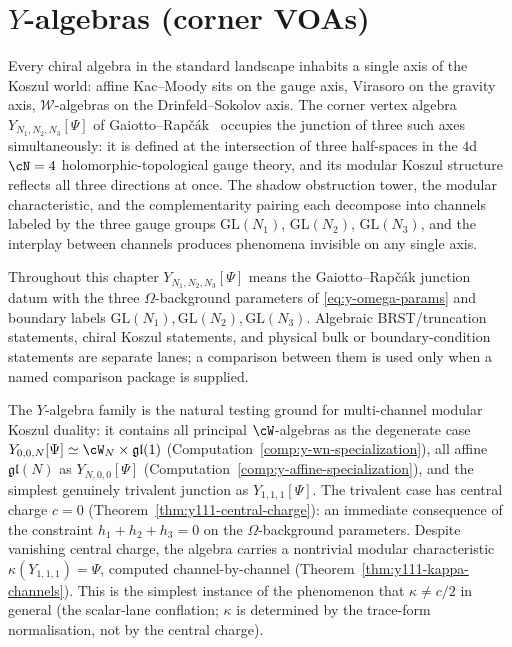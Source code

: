 \chapter{\texorpdfstring{$Y$-algebras (corner VOAs)}{Y-algebras (corner VOAs)}}\label{chap:y-algebras}\label{ch:y-algebras}

Every chiral algebra in the standard landscape inhabits a single
axis of the Koszul world: affine Kac--Moody sits on the gauge axis,
Virasoro on the gravity axis, $\mathcal{W}$-algebras on the
Drinfeld--Sokolov axis. The corner vertex algebra
$Y_{N_1,N_2,N_3}[\Psi]$ of
Gaiotto--Rap\v{c}\'ak~\cite{gaiotto-rapchak} occupies the junction
of three such axes simultaneously: it is defined at the
intersection of three half-spaces in the $4$d $\cN = 4$
holomorphic-topological gauge theory, and its modular Koszul
structure reflects all three directions at once. The shadow
obstruction tower, the modular characteristic, and the
complementarity pairing each decompose into channels labeled by the
three gauge groups $\mathrm{GL}(N_1)$, $\mathrm{GL}(N_2)$,
$\mathrm{GL}(N_3)$, and the interplay between channels produces
phenomena invisible on any single axis.

Throughout this chapter \(Y_{N_1,N_2,N_3}[\Psi]\) means the
Gaiotto--Rap\v{c}\'ak junction datum with the three
\(\Omega\)-background parameters of
\eqref{eq:y-omega-params} and boundary labels
\(\mathrm{GL}(N_1),\mathrm{GL}(N_2),\mathrm{GL}(N_3)\).  Algebraic
BRST/truncation statements, chiral Koszul statements, and physical
bulk or boundary-condition statements are separate lanes; a comparison
between them is used only when a named comparison package is supplied.

The $Y$-algebra family is the natural testing ground for
multi-channel modular Koszul duality: it contains all principal
$\cW$-algebras as the degenerate case $Y_{0,0,N}[\Psi] \simeq
\cW_N \times \mathfrak{gl}(1)$ (Computation~\ref{comp:y-wn-specialization}), all affine
$\mathfrak{gl}(N)$ as $Y_{N,0,0}[\Psi]$
(Computation~\ref{comp:y-affine-specialization}), and
the simplest genuinely trivalent junction as $Y_{1,1,1}[\Psi]$.
The trivalent case has central charge $c = 0$
(Theorem~\ref{thm:y111-central-charge}): an immediate
consequence of the constraint $h_1 + h_2 + h_3 = 0$ on the
$\Omega$-background parameters. Despite vanishing central charge, the
algebra carries a nontrivial modular characteristic
$\kappa(Y_{1,1,1}) = \Psi$, computed channel-by-channel
(Theorem~\ref{thm:y111-kappa-channels}). This is the simplest
instance of the phenomenon that $\kappa \neq c/2$ in general
(the scalar-lane conflation; $\kappa$ is determined by the
trace-form normalisation, not by the central charge).

